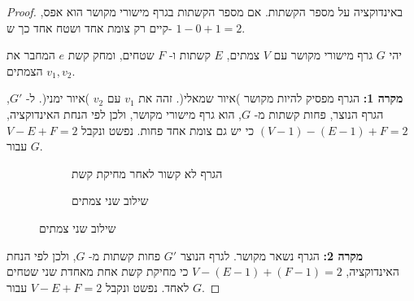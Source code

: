 \begin{proof}
באינדוקציה על מספר הקשתות. אם מספר הקשתות בגרף מישורי מקושר הוא אפס, קיים רק צומת אחד ושטח אחד כך ש-%
$1-0+1=2$.

יהי 
$G$
גרף מישורי מקושר עם 
$V$
צמתים, 
$E$
קשתות ו-%
$F$
שטחים, ומחק קשת 
$e$
המחבר את הצמתים
$v_1,v_2$.


\textbf{מקרה 1:}
הגרף מפסיק להיות מקושר )איור שמאלי(. זהה את
$v_1$
עם
$v_2$
)איור ימני(.
ל-%
$G'$,
הגרף הנוצר, פחות קשתות מ-%
$G$,
הוא גרף מישורי מקושר,
ולכן לפי הנחת האינדוקציה,
$(V-1)-(E-1)+F=2$
כי יש גם צומת אחד פחות. נפשט ונקבל
$V-E+F=2$
עבור
$G$.

\begin{figure}
\begin{center}
\begin{subfigure}{.4\textwidth}
\caption{הגרף לא קשור לאחר מחיקת קשת}\label{f.five-disconnected-removing}
\end{subfigure}
\hspace{3em}
\begin{subfigure}{.4\textwidth}
\caption{שילוב שני צמתים}\label{f.five-disconnected-merge}
\end{subfigure}
\end{center}
\end{figure}

\textbf{מקרה 2:}
הגרף נשאר מקושר. לגרף הנוצר
$G'$
פחות קשתות מ-%
$G$,
ולכן לפי הנחת האינדוקציה,
$V-(E-1)+(F-1)=2$
כי מחיקת קשת אחת מאחדת שני שטחים לאחד. נפשט ונקבל
$V-E+F=2$ 
עבור
$G$.
\end{proof}

